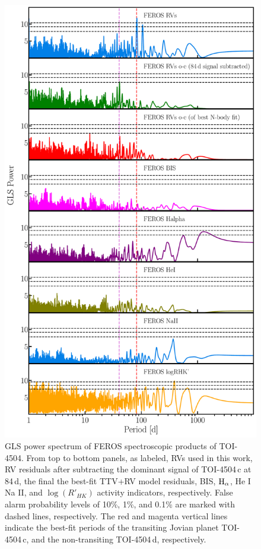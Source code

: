 \documentclass[twocolumn,twocolappendix]{aastex631}
\begin{document}
\begin{figure}
  \centering
  \includegraphics[width=1\linewidth]{GLS_TOI-4504_FEROS_in_Per_2_2.pdf}
  \caption{GLS power spectrum of FEROS spectroscopic products of TOI-4504. From top to bottom panels, as labeled, RVs used in this work, RV residuals after subtracting the dominant signal of TOI-4504\,c at 84\,d, the final the best-fit TTV+RV model residuals, BIS, $\rm{H}_{\alpha}$, He I  Na II, and $\log(R'_{HK})$ activity indicators, respectively. False alarm probability levels of 10\%, 1\%, and 0.1\% are marked with dashed lines, respectively. The red and magenta vertical lines indicate the best-fit periods of the transiting Jovian planet TOI-4504\,c, and the non-transiting TOI-4504\,d, respectively. }
  \label{activity}
\end{figure}
\end{document}
